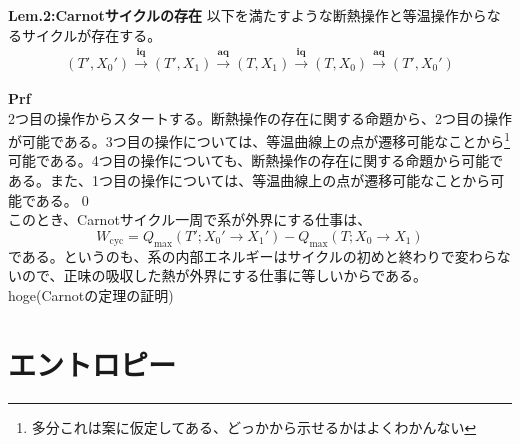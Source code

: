\documentclass[a4paper,11pt]{jsarticle}
\numberwithin{equation}{section}
\begin{document}
\begin{itembox}[l]{\textbf{Lem.2:Carnotサイクルの存在}}
    以下を満たすような断熱操作と等温操作からなるサイクルが存在する。
    \begin{align}
        (T',X_0') \xrightarrow{\textbf{iq}} (T',X_1) \xrightarrow{\textbf{aq}} (T,X_1) \xrightarrow{\textbf{iq}} (T,X_0) \xrightarrow{\textbf{aq}} (T',X_0')
    \end{align}
\end{itembox}
\textbf{Prf}\\
2つ目の操作からスタートする。断熱操作の存在に関する命題から、2つ目の操作が可能である。3つ目の操作については、等温曲線上の点が遷移可能なことから\footnote{多分これは案に仮定してある、どっかから示せるかはよくわかんない}
可能である。4つ目の操作についても、断熱操作の存在に関する命題から可能である。また、1つ目の操作については、等温曲線上の点が遷移可能なことから可能である。\qed\\

このとき、Carnotサイクル一周で系が外界にする仕事は、
\begin{equation}
    W_{\text{cyc}} = Q_{\text{max}}(T';X_0'\rightarrow X_1') - Q_{\text{max}}(T;X_0\rightarrow X_1)
\end{equation}
である。というのも、系の内部エネルギーはサイクルの初めと終わりで変わらないので、正味の吸収した熱が外界にする仕事に等しいからである。\\

hoge(Carnotの定理の証明)



\section{エントロピー}
\end{document}
